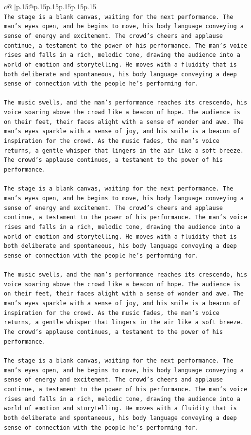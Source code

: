 \documentclass{article}
\begin{document}
{\begin{supertabular}{c@{$\;$}|p{.15\linewidth}@{}p{.15\linewidth}p{.15\linewidth}p{.15\linewidth}p{.15\linewidth}p{.15\linewidth}}
{{{\\ 
\texttt{The stage is a blank canvas, waiting for the next performance. The man's eyes open, and he begins to move, his body language conveying a sense of energy and excitement. The crowd's cheers and applause continue, a testament to the power of his performance. The man's voice rises and falls in a rich, melodic tone, drawing the audience into a world of emotion and storytelling. He moves with a fluidity that is both deliberate and spontaneous, his body language conveying a deep sense of connection with the people he's performing for.} \\
\\ 
\texttt{The music swells, and the man's performance reaches its crescendo, his voice soaring above the crowd like a beacon of hope. The audience is on their feet, their faces alight with a sense of wonder and awe. The man's eyes sparkle with a sense of joy, and his smile is a beacon of inspiration for the crowd. As the music fades, the man's voice returns, a gentle whisper that lingers in the air like a soft breeze. The crowd's applause continues, a testament to the power of his performance.} \\
\\ 
\texttt{The stage is a blank canvas, waiting for the next performance. The man's eyes open, and he begins to move, his body language conveying a sense of energy and excitement. The crowd's cheers and applause continue, a testament to the power of his performance. The man's voice rises and falls in a rich, melodic tone, drawing the audience into a world of emotion and storytelling. He moves with a fluidity that is both deliberate and spontaneous, his body language conveying a deep sense of connection with the people he's performing for.} \\
\\ 
\texttt{The music swells, and the man's performance reaches its crescendo, his voice soaring above the crowd like a beacon of hope. The audience is on their feet, their faces alight with a sense of wonder and awe. The man's eyes sparkle with a sense of joy, and his smile is a beacon of inspiration for the crowd. As the music fades, the man's voice returns, a gentle whisper that lingers in the air like a soft breeze. The crowd's applause continues, a testament to the power of his performance.} \\
\\ 
\texttt{The stage is a blank canvas, waiting for the next performance. The man's eyes open, and he begins to move, his body language conveying a sense of energy and excitement. The crowd's cheers and applause continue, a testament to the power of his performance. The man's voice rises and falls in a rich, melodic tone, drawing the audience into a world of emotion and storytelling. He moves with a fluidity that is both deliberate and spontaneous, his body language conveying a deep sense of connection with the people he's performing for.} \\
}}}
\end{supertabular}}
\end{document}
